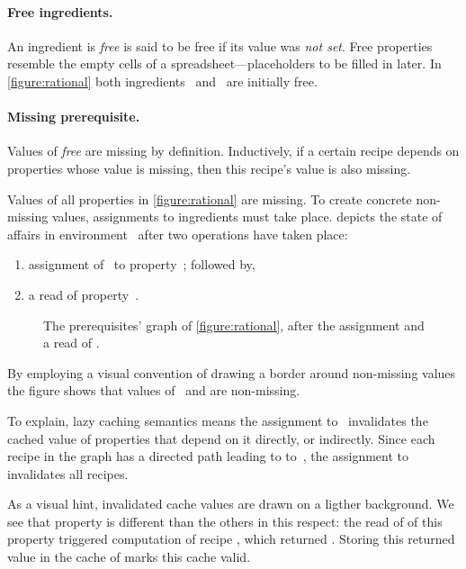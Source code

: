 \paragraph{Free ingredients.}
An ingredient is \emph{free} is said to be free if its value was \emph{not
set}. Free properties resemble the empty cells of a spreadsheet---placeholders
to be filled in later. In \cref{figure:rational} both ingredients~
and~ are initially free.

\paragraph{Missing prerequisite.}
Values of \emph{free} are missing by definition. Inductively, if a certain
recipe depends on properties whose value is missing, then this recipe's value
is also missing.

Values of all properties in \cref{figure:rational} are missing. To create
concrete non-missing values, assignments to ingredients must take place.
 depicts the state of affairs in
environment~ after two operations have taken place:
\begin{enumerate}
  \item assignment of~ to property~; followed by,
  \item a read of property~.
\end{enumerate}

\begin{figure}
  \caption{\label{figure:rational:1}%
    The prerequisites' graph of \cref{figure:rational},
    after the assignment  and a read of .
  }
  \begin{adjustbox}{max width=\columnwidth}
    
  \end{adjustbox}
\end{figure}

By employing a visual convention of drawing a border around non-missing values
the figure shows that values of~ and  are non-missing.

To explain, lazy caching semantics means the assignment to~ invalidates
the cached value of properties that depend on it directly,
or indirectly. Since each recipe in the graph has a directed path
leading to to~, the assignment to~ invalidates all recipes.

As a visual hint, invalidated cache values are drawn on a ligther background.
We see that property  is different than the others in this
respect: the read of of this property triggered computation of recipe
, which returned . Storing this returned value in the cache
of  marks this cache valid.

